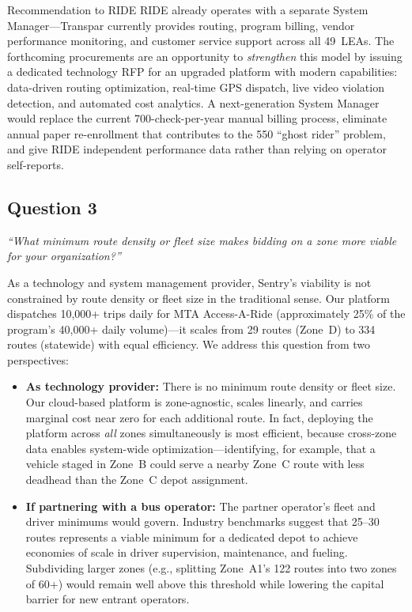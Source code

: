 \begin{sidebar}{Recommendation to RIDE}
RIDE already operates with a separate System Manager---Transpar currently provides routing, program billing, vendor performance monitoring, and customer service support across all 49~LEAs. The forthcoming procurements are an opportunity to \textit{strengthen} this model by issuing a dedicated technology RFP for an upgraded platform with modern capabilities: data-driven routing optimization, real-time GPS dispatch, live video violation detection, and automated cost analytics. A next-generation System Manager would replace the current 700-check-per-year manual billing process, eliminate annual paper re-enrollment that contributes to the 550 ``ghost rider'' problem, and give RIDE independent performance data rather than relying on operator self-reports.
\end{sidebar}

\subsection{Question 3}
\textit{``What minimum route density or fleet size makes bidding on a zone more viable for your organization?''}

As a technology and system management provider, Sentry's viability is not constrained by route density or fleet size in the traditional sense. Our platform dispatches 10,000+ trips daily for MTA Access-A-Ride (approximately 25\% of the program's 40,000+ daily volume)---it scales from 29 routes (Zone~D) to 334 routes (statewide) with equal efficiency. We address this question from two perspectives:

\begin{itemize}
    \item \textbf{As technology provider:} There is no minimum route density or fleet size. Our cloud-based platform is zone-agnostic, scales linearly, and carries marginal cost near zero for each additional route. In fact, deploying the platform across \textit{all} zones simultaneously is most efficient, because cross-zone data enables system-wide optimization---identifying, for example, that a vehicle staged in Zone~B could serve a nearby Zone~C route with less deadhead than the Zone~C depot assignment.
    \item \textbf{If partnering with a bus operator:} The partner operator's fleet and driver minimums would govern. Industry benchmarks suggest that 25--30 routes represents a viable minimum for a dedicated depot to achieve economies of scale in driver supervision, maintenance, and fueling. Subdividing larger zones (e.g., splitting Zone~A1's 122 routes into two zones of 60+) would remain well above this threshold while lowering the capital barrier for new entrant operators.
\end{itemize}

